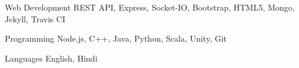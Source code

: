 
\begin{cvskills}

  \cvskill
    {Web Development} %
    {REST API, Express, Socket-IO, Bootstrap, HTML5, Mongo, Jekyll, Travis CI} %

  \cvskill
    {Programming} %
    {Node.js, C++, Java, Python, Scala, Unity, Git} %

  \cvskill
    {Languages} %
    {English, Hindi} %

\end{cvskills}
